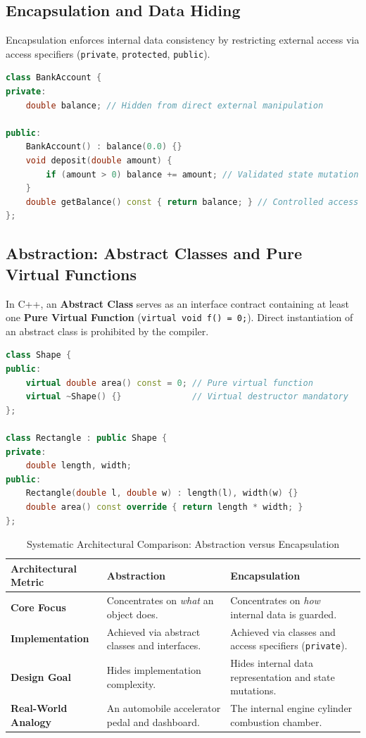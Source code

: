 \subsection{Encapsulation and Data Hiding}
Encapsulation enforces internal data consistency by restricting external access via access specifiers (\texttt{private}, \texttt{protected}, \texttt{public}).
\begin{lstlisting}[language=C++]
class BankAccount {
private:
    double balance; // Hidden from direct external manipulation

public:
    BankAccount() : balance(0.0) {}
    void deposit(double amount) {
        if (amount > 0) balance += amount; // Validated state mutation
    }
    double getBalance() const { return balance; } // Controlled access
};
\end{lstlisting}

\subsection{Abstraction: Abstract Classes and Pure Virtual Functions}
In C++, an \textbf{Abstract Class} serves as an interface contract containing at least one \textbf{Pure Virtual Function} (\texttt{virtual void f() = 0;}). Direct instantiation of an abstract class is prohibited by the compiler.

\begin{lstlisting}[language=C++]
class Shape {
public:
    virtual double area() const = 0; // Pure virtual function
    virtual ~Shape() {}              // Virtual destructor mandatory
};

class Rectangle : public Shape {
private:
    double length, width;
public:
    Rectangle(double l, double w) : length(l), width(w) {}
    double area() const override { return length * width; }
};
\end{lstlisting}

\begin{table}[htbp]
\centering
\small
\begin{tabularx}{\textwidth}{l X X}
\toprule
\textbf{Architectural Metric} & \textbf{Abstraction} & \textbf{Encapsulation} \\
\midrule
\textbf{Core Focus} & Concentrates on \textit{what} an object does. & Concentrates on \textit{how} internal data is guarded. \\
\textbf{Implementation} & Achieved via abstract classes and interfaces. & Achieved via classes and access specifiers (\texttt{private}). \\
\textbf{Design Goal} & Hides implementation complexity. & Hides internal data representation and state mutations. \\
\textbf{Real-World Analogy} & An automobile accelerator pedal and dashboard. & The internal engine cylinder combustion chamber. \\
\bottomrule
\end{tabularx}
\caption{Systematic Architectural Comparison: Abstraction versus Encapsulation}
\label{tab:abstraction_vs_encapsulation}
\end{table}


